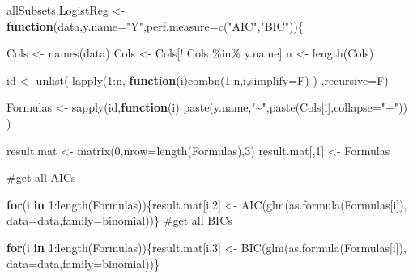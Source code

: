\documentclass[
  letterpaper,
  DIV=11,
  numbers=noendperiod]{scrartcl}
\newenvironment{Shaded}{\begin{snugshade}}{\end{snugshade}}
\newcommand{\AttributeTok}[1]{\textcolor[rgb]{0.40,0.45,0.13}{#1}}
\newcommand{\CommentTok}[1]{\textcolor[rgb]{0.37,0.37,0.37}{#1}}
\newcommand{\ControlFlowTok}[1]{\textcolor[rgb]{0.00,0.23,0.31}{\textbf{#1}}}
\newcommand{\DecValTok}[1]{\textcolor[rgb]{0.68,0.00,0.00}{#1}}
\newcommand{\FunctionTok}[1]{\textcolor[rgb]{0.28,0.35,0.67}{#1}}
\newcommand{\NormalTok}[1]{\textcolor[rgb]{0.00,0.23,0.31}{#1}}
\newcommand{\OtherTok}[1]{\textcolor[rgb]{0.00,0.23,0.31}{#1}}
\newcommand{\SpecialCharTok}[1]{\textcolor[rgb]{0.37,0.37,0.37}{#1}}
\newcommand{\StringTok}[1]{\textcolor[rgb]{0.13,0.47,0.30}{#1}}
\begin{document}
\begin{Shaded}
\begin{Highlighting}[]
\NormalTok{allSubsets.LogistReg }\OtherTok{\textless{}{-}} \ControlFlowTok{function}\NormalTok{(data,}\AttributeTok{y.name=}\StringTok{"Y"}\NormalTok{,}\AttributeTok{perf.measure=}\FunctionTok{c}\NormalTok{(}\StringTok{"AIC"}\NormalTok{,}\StringTok{"BIC"}\NormalTok{))\{}
  
\NormalTok{  Cols }\OtherTok{\textless{}{-}} \FunctionTok{names}\NormalTok{(data)}
\NormalTok{  Cols }\OtherTok{\textless{}{-}}\NormalTok{ Cols[}\SpecialCharTok{!}\NormalTok{ Cols }\SpecialCharTok{\%in\%}\NormalTok{ y.name]}
\NormalTok{  n }\OtherTok{\textless{}{-}} \FunctionTok{length}\NormalTok{(Cols)}
  
\NormalTok{  id }\OtherTok{\textless{}{-}} \FunctionTok{unlist}\NormalTok{(}
    \FunctionTok{lapply}\NormalTok{(}\DecValTok{1}\SpecialCharTok{:}\NormalTok{n,}
           \ControlFlowTok{function}\NormalTok{(i)}\FunctionTok{combn}\NormalTok{(}\DecValTok{1}\SpecialCharTok{:}\NormalTok{n,i,}\AttributeTok{simplify=}\NormalTok{F)}
\NormalTok{    )}
\NormalTok{    ,}\AttributeTok{recursive=}\NormalTok{F)}
  
\NormalTok{  Formulas }\OtherTok{\textless{}{-}} \FunctionTok{sapply}\NormalTok{(id,}\ControlFlowTok{function}\NormalTok{(i)}
    \FunctionTok{paste}\NormalTok{(y.name,}\StringTok{"\textasciitilde{}"}\NormalTok{,}\FunctionTok{paste}\NormalTok{(Cols[i],}\AttributeTok{collapse=}\StringTok{"+"}\NormalTok{))}
\NormalTok{  )}
  
\NormalTok{  result.mat }\OtherTok{\textless{}{-}} \FunctionTok{matrix}\NormalTok{(}\DecValTok{0}\NormalTok{,}\AttributeTok{nrow=}\FunctionTok{length}\NormalTok{(Formulas),}\DecValTok{3}\NormalTok{)}
\NormalTok{  result.mat[,}\DecValTok{1}\NormalTok{] }\OtherTok{\textless{}{-}}\NormalTok{ Formulas}
  
 
  \CommentTok{\#get all AIC\textquotesingle{}s}
  
  \ControlFlowTok{for}\NormalTok{(i }\ControlFlowTok{in} \DecValTok{1}\SpecialCharTok{:}\FunctionTok{length}\NormalTok{(Formulas))\{result.mat[i,}\DecValTok{2}\NormalTok{] }\OtherTok{\textless{}{-}} \FunctionTok{AIC}\NormalTok{(}\FunctionTok{glm}\NormalTok{(}\FunctionTok{as.formula}\NormalTok{(Formulas[i]),}
                                                         \AttributeTok{data=}\NormalTok{data,}\AttributeTok{family=}\NormalTok{binomial))\}}
  \CommentTok{\#get all BIC\textquotesingle{}s}
  
  \ControlFlowTok{for}\NormalTok{(i }\ControlFlowTok{in} \DecValTok{1}\SpecialCharTok{:}\FunctionTok{length}\NormalTok{(Formulas))\{result.mat[i,}\DecValTok{3}\NormalTok{] }\OtherTok{\textless{}{-}} \FunctionTok{BIC}\NormalTok{(}\FunctionTok{glm}\NormalTok{(}\FunctionTok{as.formula}\NormalTok{(Formulas[i]),}
                                                         \AttributeTok{data=}\NormalTok{data,}\AttributeTok{family=}\NormalTok{binomial))\}}
  

\end{Highlighting}
\end{Shaded}
\end{document}

